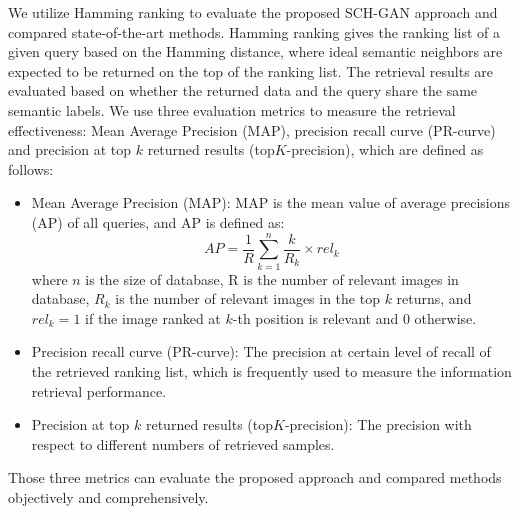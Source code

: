 \documentclass[journal]{IEEEtran}
\begin{document}
We utilize Hamming ranking to evaluate the proposed SCH-GAN approach and compared state-of-the-art methods. Hamming ranking gives the ranking list of a given query based on the Hamming distance, where ideal semantic neighbors are expected to be returned on the top of the ranking list. The retrieval results are evaluated based on whether the returned data and the query share the same semantic labels. We use three evaluation metrics to measure the retrieval effectiveness: Mean Average Precision (MAP), precision recall curve (PR-curve) and precision at top $k$ returned results (top$K$-precision), which are defined as follows:
\begin{itemize}
	\item Mean Average Precision (MAP): MAP is the mean value of average precisions (AP) of all queries, and AP is defined as:
	\begin{equation}
	AP=\frac{1}{R}\sum_{k=1}^{n}\frac{k}{R_k}\times rel_k
	\end{equation}
	where $n$ is the size of database, R is the number of relevant images in database, $R_k$ is the number of relevant images in the top $k$ returns, and $rel_k=1$ if the image ranked at $k$-th position is relevant and 0 otherwise. 
	\item Precision recall curve (PR-curve): The precision at certain level of recall of the retrieved ranking list, which is frequently used to measure the information retrieval performance.
	\item Precision at top $k$ returned results (top$K$-precision): The precision with respect to different numbers of retrieved samples.
\end{itemize}
Those three metrics can evaluate the proposed approach and compared methods objectively and comprehensively.
\end{document}
